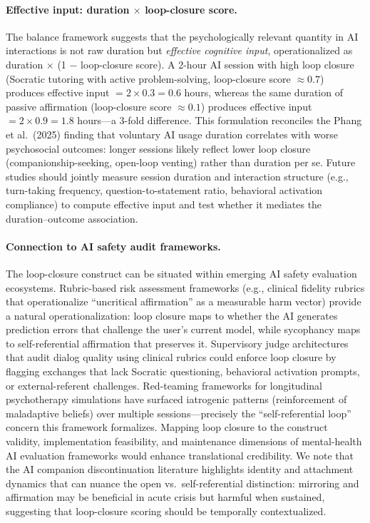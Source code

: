 \documentclass[a4paper,11pt,titlepage]{article}
\begin{document}
\paragraph{Effective input: duration $\times$ loop-closure score.}
The balance framework suggests that the psychologically relevant quantity in AI interactions is not raw duration but \textit{effective cognitive input}, operationalized as duration $\times$ (1 $-$ loop-closure score). A 2-hour AI session with high loop closure (Socratic tutoring with active problem-solving, loop-closure score $\approx 0.7$) produces effective input $= 2 \times 0.3 = 0.6$ hours, whereas the same duration of passive affirmation (loop-closure score $\approx 0.1$) produces effective input $= 2 \times 0.9 = 1.8$ hours---a 3-fold difference. This formulation reconciles the Phang et al.~(2025) finding that voluntary AI usage duration correlates with worse psychosocial outcomes: longer sessions likely reflect lower loop closure (companionship-seeking, open-loop venting) rather than duration per se. Future studies should jointly measure session duration and interaction structure (e.g., turn-taking frequency, question-to-statement ratio, behavioral activation compliance) to compute effective input and test whether it mediates the duration--outcome association.

\paragraph{Connection to AI safety audit frameworks.}
The loop-closure construct can be situated within emerging AI safety evaluation ecosystems. Rubric-based risk assessment frameworks (e.g., clinical fidelity rubrics that operationalize ``uncritical affirmation'' as a measurable harm vector) provide a natural operationalization: loop closure maps to whether the AI generates prediction errors that challenge the user's current model, while sycophancy maps to self-referential affirmation that preserves it. Supervisory judge architectures that audit dialog quality using clinical rubrics could enforce loop closure by flagging exchanges that lack Socratic questioning, behavioral activation prompts, or external-referent challenges. Red-teaming frameworks for longitudinal psychotherapy simulations have surfaced iatrogenic patterns (reinforcement of maladaptive beliefs) over multiple sessions---precisely the ``self-referential loop'' concern this framework formalizes. Mapping loop closure to the construct validity, implementation feasibility, and maintenance dimensions of mental-health AI evaluation frameworks would enhance translational credibility. We note that the AI companion discontinuation literature highlights identity and attachment dynamics that can nuance the open vs.\ self-referential distinction: mirroring and affirmation may be beneficial in acute crisis but harmful when sustained, suggesting that loop-closure scoring should be temporally contextualized.
\end{document}
